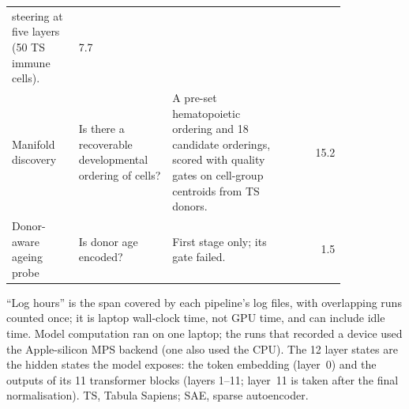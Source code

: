 {\begin{longtable}{@{}p{0.20\linewidth}p{0.28\linewidth}p{0.36\linewidth}r@{}}
steering at five layers (50 TS immune cells). & 7.7 \\
Manifold discovery & Is there a recoverable developmental ordering of
cells? & A pre-set hematopoietic ordering and 18 candidate orderings,
scored with quality gates on cell-group centroids from TS donors. & 15.2 \\
Donor-aware ageing probe & Is donor age encoded? & First stage only; its
gate failed. & 1.5 \\
\end{longtable}
\begin{flushleft}
``Log
hours'' is the span covered by each pipeline's log files, with
overlapping runs counted once; it is laptop wall-clock time, not GPU
time, and can include idle time. Model computation ran on one laptop;
the runs that recorded a device used the Apple-silicon MPS backend (one
also used the CPU). The 12 layer states are the hidden states the model
exposes: the token embedding (layer~0) and the outputs of its 11
transformer blocks (layers 1--11; layer~11 is taken after the final
normalisation). TS, Tabula Sapiens; SAE, sparse autoencoder.
\end{flushleft}
}

